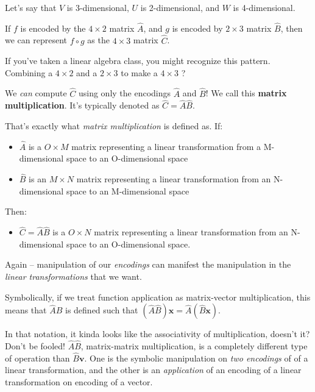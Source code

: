 \documentclass[]{article}
\begin{document}
Let's say that \(V\) is 3-dimensional, \(U\) is 2-dimensional, and \(W\) is
4-dimensional.

If \(f\) is encoded by the \(4 \times 2\) matrix \(\hat{A}\), and \(g\) is
encoded by \(2 \times 3\) matrix \(\hat{B}\), then we can represent
\(f \circ g\) as the \(4
\times 3\) matrix \(\hat{C}\).

If you've taken a linear algebra class, you might recognize this pattern.
Combining a \(4 \times 2\) and a \(2 \times 3\) to make a \(4 \times 3\) ?

We \emph{can} compute \(\hat{C}\) using only the encodings \(\hat{A}\) and
\(\hat{B}\)! We call this \textbf{matrix multiplication}. It's typically denoted
as \(\hat{C} =
\hat{A} \hat{B}\).

That's exactly what \emph{matrix multiplication} is defined as. If:

\begin{itemize}
\tightlist
\item
  \(\hat{A}\) is a \(O \times M\) matrix representing a linear transformation
  from a M-dimensional space to an O-dimensional space
\item
  \(\hat{B}\) is an \(M \times N\) matrix representing a linear transformation
  from an N-dimensional space to an M-dimensional space
\end{itemize}

Then:

\begin{itemize}
\tightlist
\item
  \(\hat{C} = \hat{A}\hat{B}\) is a \(O \times N\) matrix representing a linear
  transformation from an N-dimensional space to an O-dimensional space.
\end{itemize}

Again -- manipulation of our \emph{encodings} can manifest the manipulation in
the \emph{linear transformations} that we want.

Symbolically, if we treat function application as matrix-vector multiplication,
this means that \(\hat{A}\hat{B}\) is defined such that
\((\hat{A}\hat{B})\mathbf{x} = \hat{A}(\hat{B}\mathbf{x})\).

In that notation, it kinda looks like the associativity of multiplication,
doesn't it? Don't be fooled! \(\hat{A} \hat{B}\), matrix-matrix multiplication,
is a completely different type of operation than \(\hat{B}\mathbf{v}\). One is
the symbolic manipulation on \emph{two encodings} of of a linear transformation,
and the other is an \emph{application} of an encoding of a linear transformation
on encoding of a vector.
\end{document}
